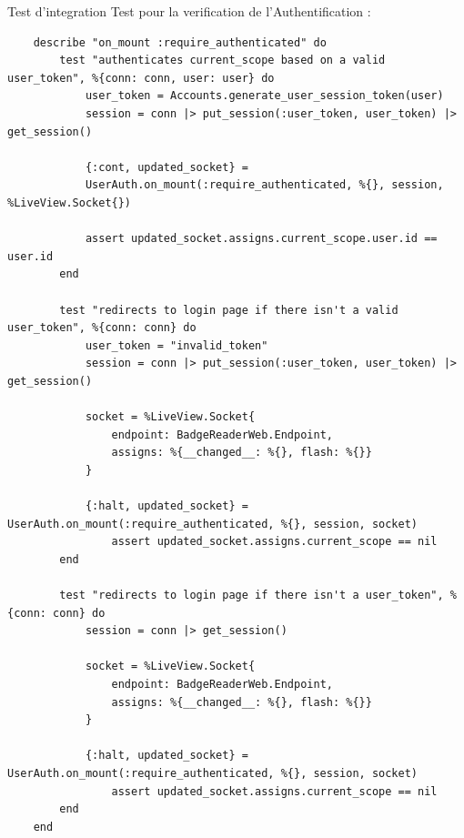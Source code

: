 \text{\newline}

\begin{for_you}{Test d'integration}
    Test pour la verification de l'Authentification :
    \begin{lstlisting}
    describe "on_mount :require_authenticated" do
        test "authenticates current_scope based on a valid user_token", %{conn: conn, user: user} do
            user_token = Accounts.generate_user_session_token(user)
            session = conn |> put_session(:user_token, user_token) |> get_session()

            {:cont, updated_socket} =
            UserAuth.on_mount(:require_authenticated, %{}, session, %LiveView.Socket{})

            assert updated_socket.assigns.current_scope.user.id == user.id
        end

        test "redirects to login page if there isn't a valid user_token", %{conn: conn} do
            user_token = "invalid_token"
            session = conn |> put_session(:user_token, user_token) |> get_session()

            socket = %LiveView.Socket{
                endpoint: BadgeReaderWeb.Endpoint,
                assigns: %{__changed__: %{}, flash: %{}}
            }

            {:halt, updated_socket} = UserAuth.on_mount(:require_authenticated, %{}, session, socket)
                assert updated_socket.assigns.current_scope == nil
        end

        test "redirects to login page if there isn't a user_token", %{conn: conn} do
            session = conn |> get_session()

            socket = %LiveView.Socket{
                endpoint: BadgeReaderWeb.Endpoint,
                assigns: %{__changed__: %{}, flash: %{}}
            }

            {:halt, updated_socket} = UserAuth.on_mount(:require_authenticated, %{}, session, socket)
                assert updated_socket.assigns.current_scope == nil
        end
    end
    \end{lstlisting}
\end{for_you}

\text{\newline}

